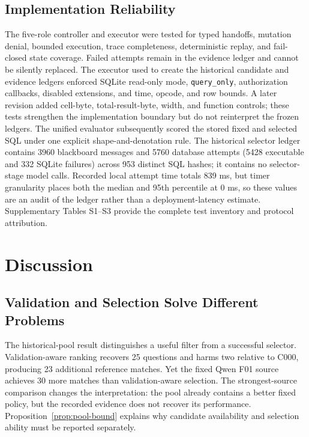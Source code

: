 \documentclass[information,article,submit,moreauthors]{Definitions/mdpi}
\begin{document}
\subsection{Implementation Reliability}

The five-role controller and executor were tested for typed handoffs, mutation denial, bounded execution, trace completeness, deterministic replay, and fail-closed state coverage. Failed attempts remain in the evidence ledger and cannot be silently replaced. The executor used to create the historical candidate and evidence ledgers enforced SQLite read-only mode, \texttt{query\_only}, authorization callbacks, disabled extensions, and time, opcode, and row bounds. A later revision added cell-byte, total-result-byte, width, and function controls; these tests strengthen the implementation boundary but do not reinterpret the frozen ledgers. The unified evaluator subsequently scored the stored fixed and selected SQL under one explicit shape-and-denotation rule. The historical selector ledger contains 3960 blackboard messages and 5760 database attempts (5428 executable and 332 SQLite failures) across 953 distinct SQL hashes; it contains no selector-stage model calls. Recorded local attempt time totals 839 ms, but timer granularity places both the median and 95th percentile at 0 ms, so these values are an audit of the ledger rather than a deployment-latency estimate. Supplementary Tables S1--S3 provide the complete test inventory and protocol attribution.

\section{Discussion}

\subsection{Validation and Selection Solve Different Problems}

The historical-pool result distinguishes a useful filter from a successful selector. Validation-aware ranking recovers 25 questions and harms two relative to C000, producing 23 additional reference matches. Yet the fixed Qwen F01 source achieves 30 more matches than validation-aware selection. The strongest-source comparison changes the interpretation: the pool already contains a better fixed policy, but the recorded evidence does not recover its performance. Proposition~\ref{prop:pool-bound} explains why candidate availability and selection ability must be reported separately.
\end{document}
